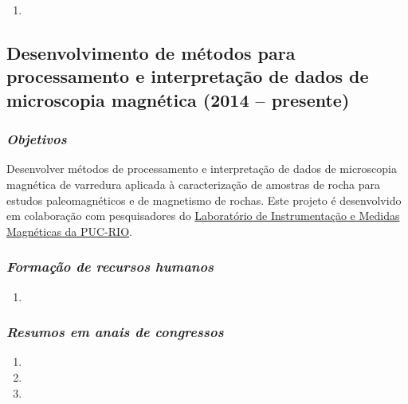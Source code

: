 \begin{enumerate}
	\item {}
\end{enumerate}


\subsection{Desenvolvimento de métodos para processamento e interpretação de dados de microscopia magnética (2014 -- presente)} \label{projeto-Andre}

\subsubsection{\emph{Objetivos}}

Desenvolver métodos de processamento e interpretação de dados de microscopia magnética 
de varredura aplicada à caracterização de amostras de rocha para estudos paleomagnéticos 
e de magnetismo de rochas. Este projeto é desenvolvido em colaboração com 
pesquisadores do \href{https://www.fis.puc-rio.br/instrumentacao-e-medidas-magneticas/}{Laboratório de Instrumentação e Medidas Magnéticas da PUC-RIO}.

\subsubsection{\emph{Formação de recursos humanos}}

\begin{enumerate}
	
	\item{}
	
\end{enumerate}

\subsubsection{\emph{Resumos em anais de congressos}}

\begin{enumerate}
	\item {}
	\item {}
	\item {}
\end{enumerate}

